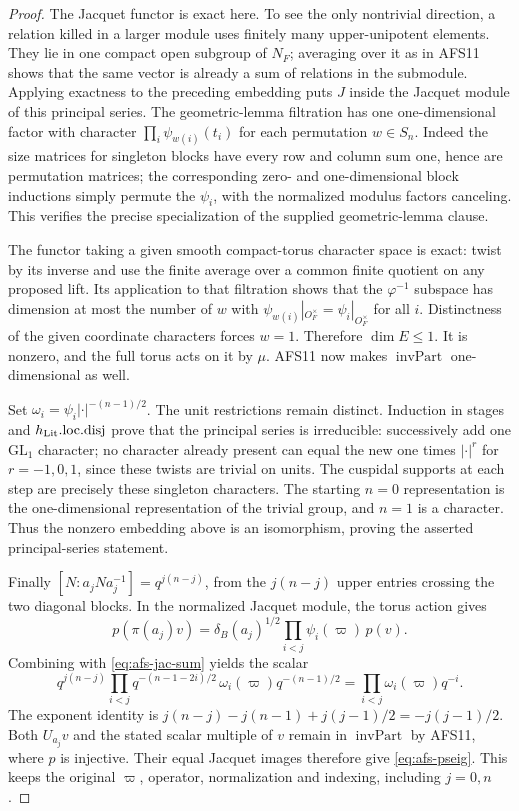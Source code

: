 \begin{proof}
The Jacquet functor is exact here.  To see the only
nontrivial direction, a relation killed in a larger module
uses finitely many upper-unipotent elements.  They lie in
one compact open subgroup of $N_F$; averaging over it as
in AFS11 shows that the same vector is already a sum of
relations in the submodule.  Applying exactness to the
preceding embedding puts $J$ inside the Jacquet module
of this principal series.  The geometric-lemma filtration
has one one-dimensional factor with character
$\prod_i\psi_{w(i)}(t_i)$ for each permutation $w\in S_n$.
Indeed the size matrices for singleton blocks have every
row and column sum one, hence are permutation matrices;
the corresponding zero- and one-dimensional block
inductions simply permute the $\psi_i$, with the normalized
modulus factors canceling.  This verifies the precise
specialization of the supplied geometric-lemma clause.

The functor taking a given smooth compact-torus character
space is exact: twist by its inverse and use the finite
average over a common finite quotient on any proposed
lift.  Its application to that filtration shows that the
$\varphi^{-1}$ subspace has dimension at most the number
of $w$ with
$\psi_{w(i)}|_{O_F^\times}=\psi_i|_{O_F^\times}$ for all $i$.
Distinctness of the given coordinate characters forces
$w=1$.  Therefore $\dim E\leq1$.  It is nonzero, and the
full torus acts on it by $\mu$.  AFS11 now makes
$\operatorname{invPart}$ one-dimensional as well.

Set $\omega_i=\psi_i|\cdot|^{-(n-1)/2}$.  The unit
restrictions remain distinct.  Induction in stages and
$h_{\rm Lit}.\mathrm{loc.disj}$ prove that the principal
series is irreducible: successively add one $\mathrm{GL}_1$
character; no character already present can equal the
new one times $|\cdot|^r$ for $r=-1,0,1$, since these
twists are trivial on units.  The cuspidal supports at
each step are precisely these singleton characters.
The starting $n=0$ representation is the one-dimensional
representation of the trivial group, and $n=1$ is a
character.  Thus the nonzero embedding above is an
isomorphism, proving the asserted principal-series statement.

Finally $[N:a_jNa_j^{-1}]=q^{j(n-j)}$, from the $j(n-j)$
upper entries crossing the two diagonal blocks.  In the
normalized Jacquet module, the torus action gives
\[
 p(\pi(a_j)v)=\delta_B(a_j)^{1/2}
                 \prod_{i<j}\psi_i(\varpi)\,p(v).
\]
Combining with \eqref{eq:afs-jac-sum} yields the scalar
\[
 q^{j(n-j)}\prod_{i<j}
     q^{-(n-1-2i)/2}\,
     \omega_i(\varpi)q^{-(n-1)/2}
   =\prod_{i<j}\omega_i(\varpi)q^{-i}.
\]
The exponent identity is
$j(n-j)-j(n-1)+j(j-1)/2=-j(j-1)/2$.
Both $U_{a_j}v$ and the stated scalar multiple of $v$
remain in $\operatorname{invPart}$ by AFS11, where $p$
is injective.  Their equal Jacquet images therefore give
\eqref{eq:afs-pseig}.  This keeps the original $\varpi$,
operator, normalization and indexing, including $j=0,n$.
\end{proof}

